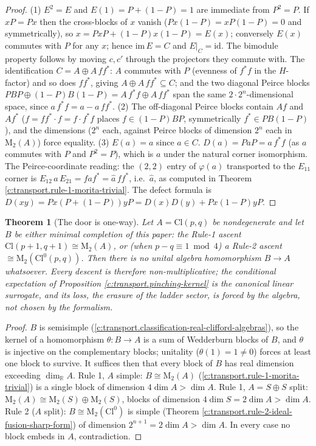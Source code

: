 \documentclass[11pt]{article}
\newtheorem{theorem}{Theorem}[section]
\theoremstyle{definition}
\theoremstyle{plain}
\providecommand{\Cl}{}\renewcommand{\Cl}{\mathrm{Cl}}
\providecommand{\Mat}{}\renewcommand{\Mat}{\mathrm{M}}
\providecommand{\R}{}\renewcommand{\R}{\mathbb{R}}
\begin{document}
\begin{proof}
(1) $E^2 = E$ and $E(1) = P + (1-P) = 1$ are immediate from $P^2 = P$. If $xP = Px$ then the cross-blocks of $x$ vanish ($Px(1-P) = xP(1-P) = 0$ and symmetrically), so $x = PxP + (1-P)x(1-P) = E(x)$; conversely $E(x)$ commutes with $P$ for any $x$; hence $\mathrm{im}\,E = C$ and $E|_C = \mathrm{id}$. The bimodule property follows by moving $c, c'$ through the projectors they commute with. The identification $C = A \oplus A\,ff^*$: $A$ commutes with $P$ (evenness of $f^*f$ in the $H$-factor) and so does $ff^*$, giving $A \oplus A\,ff^* \subseteq C$; and the two diagonal Peirce blocks $PBP \oplus (1-P)B(1-P) = A\,f^*f \oplus A\,ff^*$ span the same $2 \cdot 2^n$-dimensional space, since $a\,f^*f = a - a\,ff^*$. (2) The off-diagonal Peirce blocks contain $Af$ and $Af^*$ ($f = ff^*\cdot f = f \cdot f^*f$ places $f \in (1-P)BP$, symmetrically $f^* \in PB(1-P)$), and the dimensions ($2^n$ each, against Peirce blocks of dimension $2^n$ each in $\Mat_2(A)$) force equality. (3) $E(a) = a$ since $a \in C$. $D(a) = P a P = a\,f^*f$ (as $a$ commutes with $P$ and $P^2 = P$), which is $a$ under the natural corner isomorphism. The Peirce-coordinate reading: the $(2,2)$ entry of $\varphi(a)$ transported to the $E_{11}$ corner is $E_{12}\,a\,E_{21} = f a f^* = \hat{a}\,ff^*$, i.e.\ $\hat{a}$, as computed in Theorem \ref{c:transport.rule-1-morita-trivial}. The defect formula is $D(xy) = Px(P + (1-P))yP = D(x)D(y) + Px(1-P)yP$.

\end{proof}

\begin{theorem}[The door is one-way]\label{c:transport.door-one-way}
Let $A = \Cl(p,q)$ be nondegenerate and let $B$ be either minimal completion of this paper: the Rule-1 ascent $\Cl(p{+}1,q{+}1) \cong \Mat_2(A)$, or (when $p - q \equiv 1 \bmod 4$) a Rule-2 ascent $\cong \Mat_2(\Cl^0(p,q))$. Then there is no unital algebra homomorphism $B \to A$ whatsoever. Every descent is therefore non-multiplicative; the conditional expectation of Proposition \ref{c:transport.pinching-kernel} is the canonical linear surrogate, and its loss, the erasure of the ladder sector, is forced by the algebra, not chosen by the formalism.
\end{theorem}
\begin{proof}
$B$ is semisimple (\ref{c:transport.classification-real-clifford-algebras}), so the kernel of a homomorphism $\theta : B \to A$ is a sum of Wedderburn blocks of $B$, and $\theta$ is injective on the complementary blocks; unitality ($\theta(1) = 1 \neq 0$) forces at least one block to survive. It suffices then that every block of $B$ has real dimension exceeding $\dim_\R A$. Rule 1, $A$ simple: $B \cong \Mat_2(A)$ (\ref{c:transport.rule-1-morita-trivial}) is a single block of dimension $4 \dim A > \dim A$. Rule 1, $A = S \oplus S$ split: $\Mat_2(A) \cong \Mat_2(S) \oplus \Mat_2(S)$, blocks of dimension $4 \dim S = 2 \dim A > \dim A$. Rule 2 ($A$ split): $B \cong \Mat_2(\Cl^0)$ is simple (Theorem \ref{c:transport.rule-2-ideal-fusion-sharp-form}) of dimension $2^{n+1} = 2\dim A > \dim A$. In every case no block embeds in $A$, contradiction.

\end{proof}
\end{document}
